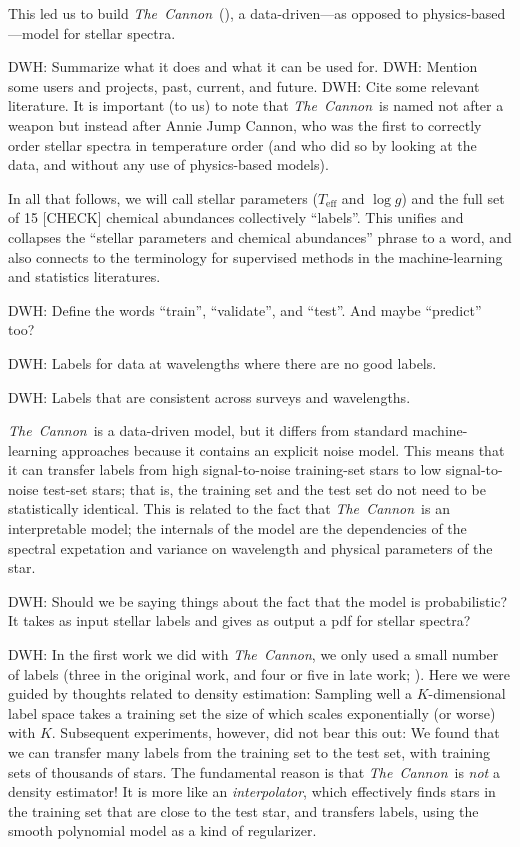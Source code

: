 \documentclass[12pt,preprint]{aastex}
\newcommand{\project}[1]{\textsl{#1}}
\newcommand{\TheCannon}{\project{The~Cannon}}
\newcommand{\logg}{\log g}
\newcommand{\Teff}{T_{\mathrm{eff}}}
\begin{document}
This led us to build \TheCannon\ (\citealt{tc}), a data-driven---as
opposed to physics-based---model for stellar spectra.

DWH: Summarize what it does and what it can be used for.
DWH: Mention some users and projects, past, current, and future.
DWH: Cite some relevant literature.
It is important (to us) to note that \TheCannon\ is named not after a
weapon but instead after Annie Jump Cannon, who was the first to
correctly order stellar spectra in temperature order (and who did so
by looking at the data, and without any use of physics-based models).

In all that follows, we will call stellar parameters ($\Teff$ and
$\logg$) and the full set of 15 [CHECK] chemical abundances
collectively ``labels''.
This unifies and collapses the ``stellar parameters and chemical
abundances'' phrase to a word, and also connects to the terminology
for supervised methods in the machine-learning and statistics
literatures.

DWH: Define the words ``train'', ``validate'', and ``test''.  And maybe ``predict'' too?

DWH: Labels for data at wavelengths where there are no good labels.

DWH: Labels that are consistent across surveys and wavelengths.

\TheCannon\ is a data-driven model, but it differs from standard machine-learning
approaches because it contains an explicit noise model.
This means that it can transfer labels from high signal-to-noise training-set
stars to low signal-to-noise test-set stars; that is, the training set and 
the test set do not need to be statistically identical.
This is related to the fact that \TheCannon\ is an interpretable model;
the internals of the model are the dependencies of the spectral expetation
and variance on wavelength and physical parameters of the star.

DWH: Should we be saying things about the fact that the model is probabilistic?
It takes as input stellar labels and gives as output a pdf for stellar spectra?

DWH: In the first work we did with \TheCannon, we only used a small
number of labels (three in the original work, and four or five in late
work; \citealt{tc, age}).
Here we were guided by thoughts related to density estimation:
Sampling well a $K$-dimensional label space takes a training set the
size of which scales exponentially (or worse) with $K$.
Subsequent experiments, however, did not bear this out:
We found that we can transfer many labels from the training set to
the test set, with training sets of thousands of stars.
The fundamental reason is that \TheCannon\ is \emph{not} a density estimator!
It is more like an \emph{interpolator}, which effectively finds stars in
the training set that are close to the test star, and transfers labels,
using the smooth polynomial model as a kind of regularizer.
\end{document}
